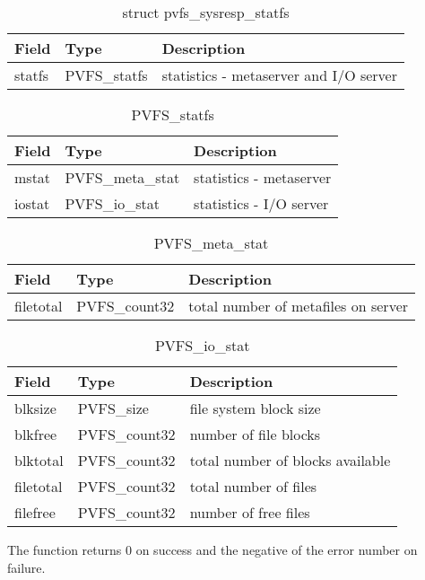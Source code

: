 \documentclass[11pt, letterpaper]{article}
\begin{document}
\begin{table}[H]
\begin{tabular}{|l|l|l|}
\hline
Field & Type & Description \\
\hline
\hline
statfs & PVFS\_statfs & statistics - metaserver and I/O server\\
\hline
\end{tabular}
\caption{struct pvfs\_sysresp\_statfs}\label{tab:respstatfs}
\end{table}

\begin{table}[H]
\begin{tabular}{|l|l|l|}
\hline
Field & Type & Description \\
\hline
\hline
mstat & PVFS\_meta\_stat & statistics - metaserver \\
\hline
iostat & PVFS\_io\_stat & statistics - I/O server \\
\hline
\end{tabular}
\caption{PVFS\_statfs}\label{tab:statfs}
\end{table}

\begin{table}[H]
\begin{tabular}{|l|l|l|}
\hline
Field & Type & Description \\
\hline
\hline
filetotal & PVFS\_count32 & total number of metafiles on server \\
\hline
\end{tabular}
\caption{PVFS\_meta\_stat}\label{tab:metastat}
\end{table}

\begin{table}[H]
\begin{tabular}{|l|l|l|}
\hline
Field & Type & Description \\
\hline
\hline
blksize & PVFS\_size & file system block size \\
\hline
blkfree & PVFS\_count32 & number of file blocks \\
\hline
blktotal & PVFS\_count32 & total number of blocks available \\
\hline 
filetotal & PVFS\_count32 & total number of files \\
\hline 
filefree & PVFS\_count32 & number of free files \\
\hline
\end{tabular}
\caption{PVFS\_io\_stat}\label{tab:iostat}
\end{table}

The function returns 0 on success and the negative of the error
number on failure.
\end{document}
